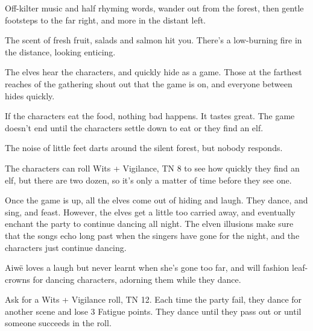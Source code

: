 \begin{multicols}{2}
\begin{boxtext}

	Off-kilter music and half rhyming words, wander out from the forest, then gentle footsteps to the far right, and more in the distant left.

	The scent of fresh fruit, salads and salmon hit you.  There's a low-burning fire in the distance, looking enticing.

\end{boxtext}

The elves hear the characters, and quickly hide as a game.  Those at the farthest reaches of the gathering shout out that the game is on, and everyone between hides quickly.

If the characters eat the food, nothing bad happens.  It tastes great.  The game doesn't end until the characters settle down to eat or they find an elf.

\begin{boxtext}

	The noise of little feet darts around the silent forest, but nobody responds.

\end{boxtext}

The characters can roll Wits + Vigilance, TN 8 to see how quickly they find an elf, but there are two dozen, so it's only a matter of time before they see one.

Once the game is up, all the elves come out of hiding and laugh.  They dance, and sing, and feast.  However, the elves get a little too carried away, and eventually enchant the party to continue dancing all night.  The elven illusions make sure that the songs echo long past when the singers have gone for the night, and the characters just continue dancing.
 

\elf

Aiw\"{e} loves a laugh but never learnt when she's gone too far, and will fashion leaf-crowns for dancing characters, adorning them while they dance.

\columnbreak


\elf


\elvenenchanter

Ask for a Wits + Vigilance roll, TN 12.  Each time the party fail, they dance for another scene and lose 3 Fatigue points.  They dance until they pass out or until someone succeeds in the roll.


\end{multicols}
